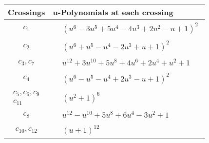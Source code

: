 \documentclass[1p]{elsarticle_modified}
\theoremstyle{definition}
\begin{document}
\begin{tabular}{m{50pt}|m{274pt}}
Crossings & \hspace{64pt}u-Polynomials at each crossing \\
\hline $$\begin{aligned}c_{1}\end{aligned}$$&$\begin{aligned}
&(u^6-3 u^5+5 u^4-4 u^3+2 u^2- u+1)^2
\end{aligned}$\\
\hline $$\begin{aligned}c_{2}\end{aligned}$$&$\begin{aligned}
&(u^6+u^5- u^4-2 u^3+u+1)^2
\end{aligned}$\\
\hline $$\begin{aligned}c_{3},c_{7}\end{aligned}$$&$\begin{aligned}
&u^{12}+3 u^{10}+5 u^8+4 u^6+2 u^4+u^2+1
\end{aligned}$\\
\hline $$\begin{aligned}c_{4}\end{aligned}$$&$\begin{aligned}
&(u^6- u^5- u^4+2 u^3- u+1)^2
\end{aligned}$\\
\hline $$\begin{aligned}c_{5},c_{6},c_{9}\\c_{11}\end{aligned}$$&$\begin{aligned}
&(u^2+1)^6
\end{aligned}$\\
\hline $$\begin{aligned}c_{8}\end{aligned}$$&$\begin{aligned}
&u^{12}- u^{10}+5 u^8+6 u^4-3 u^2+1
\end{aligned}$\\
\hline $$\begin{aligned}c_{10},c_{12}\end{aligned}$$&$\begin{aligned}
&(u+1)^{12}
\end{aligned}$\\
\hline
\end{tabular}\\~\\
\newpage\renewcommand{\arraystretch}{1}
\end{document}

